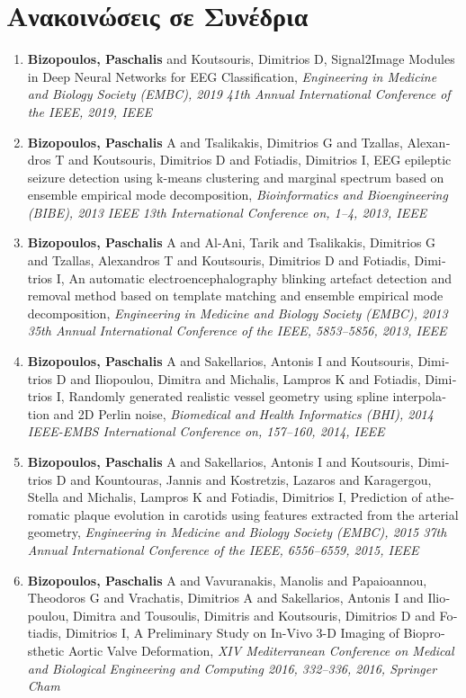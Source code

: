 \section*{Ανακοινώσεις σε Συνέδρια}
\begin{enumerate}
	\item \textlatin{\textbf{Bizopoulos, Paschalis} and Koutsouris, Dimitrios D, Signal2Image Modules in Deep Neural Networks for EEG Classification, \textit{Engineering in Medicine and Biology Society (EMBC), 2019 41th Annual International Conference of the IEEE, 2019, IEEE}}
	\item \textlatin{\textbf{Bizopoulos, Paschalis} A and Tsalikakis, Dimitrios G and Tzallas, Alexandros T and Koutsouris, Dimitrios D and Fotiadis, Dimitrios I, EEG epileptic seizure detection using k-means clustering and marginal spectrum based on ensemble empirical mode decomposition, \textit{Bioinformatics and Bioengineering (BIBE), 2013 IEEE 13th International Conference on, 1--4, 2013, IEEE}}
	\item \textlatin{\textbf{Bizopoulos, Paschalis} A and Al-Ani, Tarik and Tsalikakis, Dimitrios G and Tzallas, Alexandros T and Koutsouris, Dimitrios D and Fotiadis, Dimitrios I, An automatic electroencephalography blinking artefact detection and removal method based on template matching and ensemble empirical mode decomposition, \textit{Engineering in Medicine and Biology Society (EMBC), 2013 35th Annual International Conference of the IEEE, 5853--5856, 2013, IEEE}}
	\item \textlatin{\textbf{Bizopoulos, Paschalis} A and Sakellarios, Antonis I and Koutsouris, Dimitrios D and Iliopoulou, Dimitra and Michalis, Lampros K and Fotiadis, Dimitrios I, Randomly generated realistic vessel geometry using spline interpolation and 2D Perlin noise, \textit{Biomedical and Health Informatics (BHI), 2014 IEEE-EMBS International Conference on, 157--160, 2014, IEEE}}
	\item \textlatin{\textbf{Bizopoulos, Paschalis} A and Sakellarios, Antonis I and Koutsouris, Dimitrios D and Kountouras, Jannis and Kostretzis, Lazaros and Karagergou, Stella and Michalis, Lampros K and Fotiadis, Dimitrios I, Prediction of atheromatic plaque evolution in carotids using features extracted from the arterial geometry, \textit{Engineering in Medicine and Biology Society (EMBC), 2015 37th Annual International Conference of the IEEE, 6556--6559, 2015, IEEE}}
	\item \textlatin{\textbf{Bizopoulos, Paschalis} A and Vavuranakis, Manolis and Papaioannou, Theodoros G and Vrachatis, Dimitrios A and Sakellarios, Antonis I and Iliopoulou, Dimitra and Tousoulis, Dimitris and Koutsouris, Dimitrios D and Fotiadis, Dimitrios I, A Preliminary Study on In-Vivo 3-D Imaging of Bioprosthetic Aortic Valve Deformation, \textit{XIV Mediterranean Conference on Medical and Biological Engineering and Computing 2016, 332--336, 2016, Springer Cham}}

\end{enumerate}
